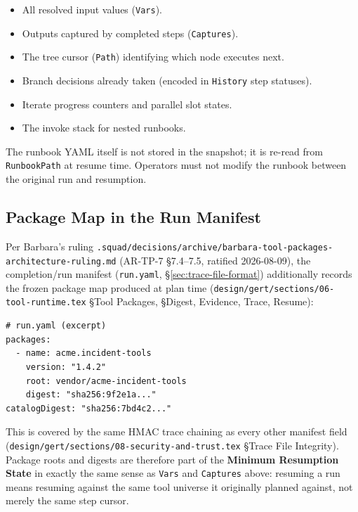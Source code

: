 \begin{itemize}
  \item All resolved input values (\texttt{Vars}).
  \item Outputs captured by completed steps (\texttt{Captures}).
  \item The tree cursor (\texttt{Path}) identifying which node executes next.
  \item Branch decisions already taken (encoded in \texttt{History} step statuses).
  \item Iterate progress counters and parallel slot states.
  \item The invoke stack for nested runbooks.
\end{itemize}

The runbook YAML itself is not stored in the snapshot; it is re-read from \texttt{RunbookPath} at resume time. Operators must not modify the runbook between the original run and resumption.

\subsection{Package Map in the Run Manifest}
\label{sec:package-resumption-manifest}

Per Barbara's ruling
\texttt{.squad/decisions/archive/barbara-tool-packages-architecture-ruling.md}
(AR-TP-7 §7.4--7.5, ratified 2026-08-09), the completion/run manifest
(\texttt{run.yaml}, \S\ref{sec:trace-file-format}) additionally records the
frozen package map produced at plan time
(\texttt{design/gert/sections/06-tool-runtime.tex} \S Tool Packages,
\S Digest, Evidence, Trace, Resume):

\begin{verbatim}
# run.yaml (excerpt)
packages:
  - name: acme.incident-tools
    version: "1.4.2"
    root: vendor/acme-incident-tools
    digest: "sha256:9f2e1a..."
catalogDigest: "sha256:7bd4c2..."
\end{verbatim}

This is covered by the same HMAC trace chaining as every other manifest
field (\texttt{design/gert/sections/08-security-and-trust.tex}
\S Trace File Integrity). Package roots and digests are therefore part of
the \textbf{Minimum Resumption State} in exactly the same sense as
\texttt{Vars} and \texttt{Captures} above: resuming a run means resuming
against the same tool universe it originally planned against, not merely
the same step cursor.

